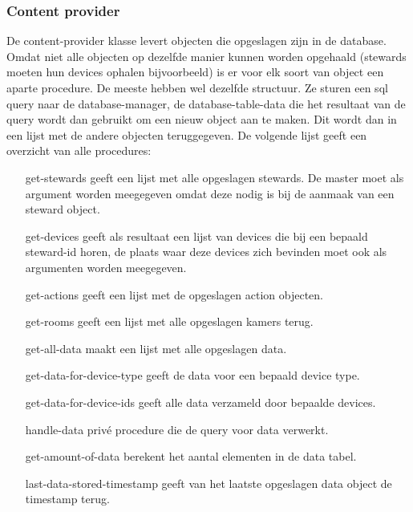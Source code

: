 \documentclass{article}
\begin{document}
\subsubsection{Content provider}
\label{ssub:content-provider}
De content-provider klasse levert objecten die opgeslagen zijn in de database. Omdat niet alle objecten op dezelfde manier kunnen worden opgehaald (stewards moeten hun devices ophalen bijvoorbeeld) is er voor elk soort van object een aparte procedure. De meeste hebben wel dezelfde structuur. Ze sturen een sql query naar de database-manager, de database-table-data die het resultaat van de query wordt dan gebruikt om een nieuw object aan te maken. Dit wordt dan in een lijst met de andere objecten teruggegeven. De volgende lijst geeft een overzicht van alle procedures:
\begin{itemize}
		\item[get-stewards] geeft een lijst met alle opgeslagen stewards. De master moet als argument worden meegegeven omdat deze nodig is bij de aanmaak van een steward object.
		\item[get-devices] geeft als resultaat een lijst van devices die bij een bepaald steward-id horen, de plaats waar deze devices zich bevinden moet ook als argumenten worden meegegeven.
		\item[get-actions] geeft een lijst met de opgeslagen action objecten.
		\item[get-rooms] geeft een lijst met alle opgeslagen kamers terug.
		\item[get-all-data] maakt een lijst met alle opgeslagen data.
		\item[get-data-for-device-type] geeft de data voor een bepaald device type.
		\item[get-data-for-device-ids] geeft alle data verzameld door bepaalde devices.
		\item[handle-data] priv\'e procedure die de query voor data verwerkt.
		\item[get-amount-of-data] berekent het aantal elementen in de data tabel.
		\item[last-data-stored-timestamp] geeft van het laatste opgeslagen data object de timestamp terug. 
\end{itemize}
\end{document}
